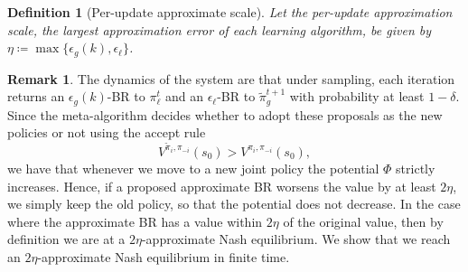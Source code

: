 \documentclass{article}
\theoremstyle{plain}
\theoremstyle{definition}
\newtheorem{definition}[theorem]{Definition}
\newtheorem{remark}[theorem]{Remark}
\begin{document}
\begin{definition}[Per-update approximate scale] \emph{Let the per-update approximation scale, the largest approximation error of each learning algorithm, be given by $\eta \coloneqq \max\{\epsilon_g(k), \epsilon_\ell\}$.}\\
\end{definition}


\begin{remark} The dynamics of the system are that under sampling, each iteration returns an $\epsilon_g(k)$-BR to $\pi_\ell^t$ and an $\epsilon_\ell$-BR to $\tilde{\pi}_g^{t+1}$ with probability at least $1-\delta$. Since the meta-algorithm decides whether to adopt these proposals as the new policies or not using the accept rule \begin{equation}V^{\tilde{\pi}_i, \pi_{-i}}(s_0) > V^{\pi_i, \pi_{-i}}(s_0),\end{equation} we have that whenever we move to a new joint policy the potential $\Phi$ strictly increases. Hence, if a proposed approximate BR worsens the value by at least $2\eta$, we simply keep the old policy, so that the potential does not decrease. In the case where the approximate BR has a value within $2\eta$ of the original value, then by definition we are at a $2\eta$-approximate Nash equilibrium. We show that we reach an $2\eta$-approximate Nash equilibrium in finite time.
\end{remark}
\end{document}
